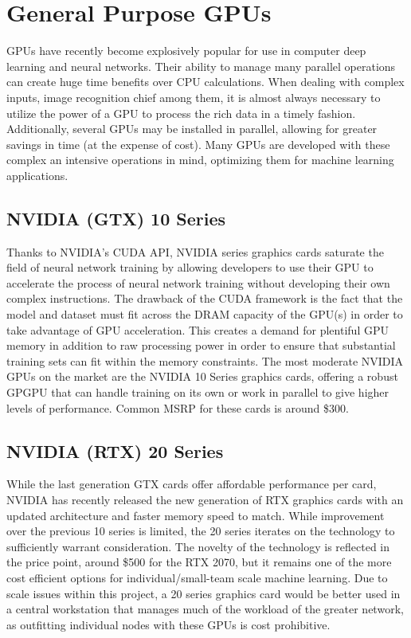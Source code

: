 \documentclass[onecolumn, draftclsnofoot,10pt, compsoc]{IEEEtran}
\begin{document}
    \section{General Purpose GPUs}
    GPUs have recently become explosively popular for use in computer deep learning and neural networks. Their ability to manage many parallel operations can create huge time benefits over CPU calculations. When dealing with complex inputs, image recognition chief among them, it is almost always necessary to utilize the power of a GPU to process the rich data in a timely fashion. Additionally, several GPUs may be installed in parallel, allowing for greater savings in time (at the expense of cost). Many GPUs are developed with these complex an intensive operations in mind, optimizing them for machine learning applications.
    \subsection{NVIDIA (GTX) 10 Series}
    Thanks to NVIDIA’s CUDA API, NVIDIA series graphics cards saturate the field of neural network training by allowing developers to use their GPU to accelerate the process of neural network training without developing their own complex instructions. The drawback of the CUDA framework is the fact that the model and dataset must fit across the DRAM capacity of the GPU(s) in order to take advantage of GPU acceleration. This creates a demand for plentiful GPU memory in addition to raw processing power in order to ensure that substantial training sets can fit within the memory constraints. The most moderate NVIDIA GPUs on the market are the NVIDIA 10 Series graphics cards, offering a robust GPGPU that can handle training on its own or work in parallel to give higher levels of performance. Common MSRP for these cards is around \$300.
    \subsection{NVIDIA (RTX) 20 Series}
    While the last generation GTX cards offer affordable performance per card, NVIDIA has recently released the new generation of RTX graphics cards with an updated architecture and faster memory speed to match. While improvement over the previous 10 series is limited, the 20 series iterates on the technology to sufficiently warrant consideration. The novelty of the technology is reflected in the price point, around \$500 for the RTX 2070, but it remains one of the more cost efficient options for individual/small-team scale machine learning. Due to scale issues within this project, a 20 series graphics card would be better used in a central workstation that manages much of the workload of the greater network, as outfitting individual nodes with these GPUs is cost prohibitive.
\end{document}
